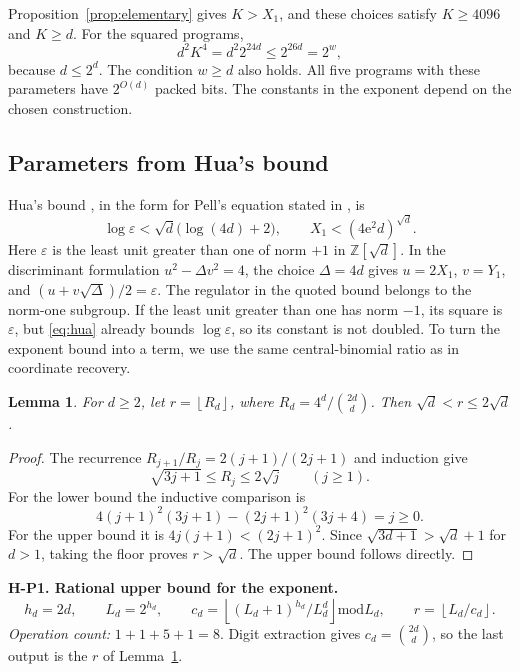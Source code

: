 \documentclass[11pt]{article}
\newtheorem{lemma}[theorem]{Lemma}
\theoremstyle{remark}
\newcommand{\Z}{\mathbb Z}
\newcommand{\eps}{\varepsilon}
\newcommand{\md}{\mathbin{\mathrm{mod}}}
\newcommand{\fl}[1]{\left\lfloor #1\right\rfloor}
\begin{document}
Proposition~\ref{prop:elementary} gives $K>X_1$, and these choices
satisfy $K\ge4096$ and $K\ge d$.
For the squared programs,
\[
  d^2K^4=d^2 2^{24d}\le2^{26d}=2^w,
\]
because $d\le2^d$. The condition $w\ge d$ also holds.
All five programs with these parameters have $2^{O(d)}$ packed bits.
The constants in the exponent depend on the chosen construction.

\subsection{Parameters from Hua's bound}

Hua's bound \cite{Hua42}, in the form for Pell's equation stated in
\cite[p.~185]{Len02}, is
\begin{equation}\label{eq:hua}
  \log\eps<\sqrt d\bigl(\log(4d)+2\bigr),\qquad
  X_1<(4\mathrm e^2d)^{\sqrt d}.
\end{equation}
Here $\eps$ is the least unit greater than one of norm $+1$ in
$\Z[\sqrt d]$. In the discriminant formulation
$u^2-\Delta v^2=4$, the choice $\Delta=4d$ gives $u=2X_1$, $v=Y_1$,
and $(u+v\sqrt\Delta)/2=\eps$.
The regulator in the quoted bound belongs to the norm-one subgroup.
If the least unit greater than one has norm $-1$, its square is $\eps$,
but \eqref{eq:hua} already bounds $\log\eps$, so its constant is not doubled.
To turn the exponent bound into a term, we use the same central-binomial
ratio as in coordinate recovery.

\begin{lemma}\label{lem:root-parameter}
For $d\ge2$, let $r=\fl{R_d}$, where
$R_d=4^d/\binom{2d}{d}$. Then $\sqrt d<r\le2\sqrt d$.
\end{lemma}

\begin{proof}
The recurrence $R_{j+1}/R_j=2(j+1)/(2j+1)$ and induction give
\[
  \sqrt{3j+1}\le R_j\le2\sqrt j\qquad(j\ge1).
\]
For the lower bound the inductive comparison is
\[
  4(j+1)^2(3j+1)-(2j+1)^2(3j+4)=j\ge0.
\]
For the upper bound it is $4j(j+1)<(2j+1)^2$.
Since $\sqrt{3d+1}>\sqrt d+1$ for $d>1$, taking the floor proves
$r>\sqrt d$. The upper bound follows directly.
\end{proof}

\textbf{H-P1. Rational upper bound for the exponent.}
\[
  h_d=2d,\qquad L_d=2^{h_d},\qquad
  c_d=\fl{(L_d+1)^{h_d}/L_d^d}\md L_d,
  \qquad r=\fl{L_d/c_d}.
\]
\emph{Operation count:} $1+1+5+1=8$.
Digit extraction gives $c_d=\binom{2d}{d}$, so the last output
is the $r$ of Lemma~\ref{lem:root-parameter}.
\end{document}
